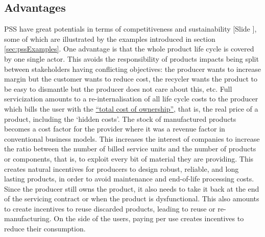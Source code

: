 \documentclass{article}
\newcounter{slide}
\begin{document}
\subsection{Advantages}
\label{sec:pssAdvantages}
PSS have great potentials in terms of competitiveness and sustainability {\color{blue}[Slide ]}, some of which are illustrated by the examples introduced in section \ref{sec:pssExamples}. One advantage is that the whole product life cycle is covered by one single actor. This avoids the responsibility of products impacts being split between stakeholders having conflicting objectives: the producer wants to increase margin but the customer wants to reduce cost, the recycler wants the product to be easy to dismantle but the producer does not care about this, etc. Full servicization amounts to a re-internalisation of all life cycle costs to the producer which bills the user with the \href{https://en.wikipedia.org/wiki/Total_cost_of_ownership}{``total cost of ownership''}, that is, the real price of a product, including the `hidden costs'. The stock of manufactured products becomes a cost factor for the provider where it was a revenue factor in conventional business models. This increases the interest of companies to increase the ratio between the number of billed service units and the number of products or components, that is, to exploit every bit of material they are providing. This creates natural incentives for producers to design robust, reliable, and long lasting products, in order to avoid maintenance and end-of-life processing costs. Since the producer still owns the product, it also needs to take it back at the end of the servicing contract or when the product is dysfunctional. This also amounts to create incentives to reuse discarded products, leading to reuse or re-manufacturing. On the side of the users, paying per use creates incentives to reduce their consumption. 



 
\end{document}
